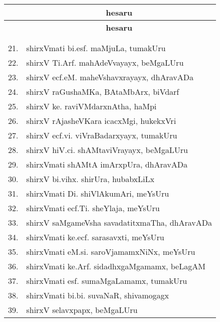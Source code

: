 \begin{center}
\begin{minipage}[t]{7cm}
{\begin{longtable}{rl}
\end{longtable}}
\end{minipage}
\qquad\quad
\begin{minipage}[t]{7cm}
{\renewcommand{\arraystretch}{1.5}
\begin{longtable}{rl}
\hline
{\bf } & \multicolumn{1}{c}{\bf hesaru}\\[3pt]
\hline
\endfirsthead
\hline
{\bf } & \multicolumn{1}{c}{\bf hesaru}\\[3pt]
\hline
  & \\[-10pt]
\endhead
\endfoot
\endlastfoot
  & \\[-10pt]
21. & shirxVmati bi.esf. maMjuLa, tumakUru\\
22. & shirxV Ti.Arf. mahAdeVvayayx, beMgaLUru\\
23. & shirxV ecf.eM. maheVshavxrayayx, dhAravADa\\
24. & shirxV raGushaMKa, BAtaMbArx, biVdarf\\
25. & shirxV ke. raviVMdarxnAtha, haMpi\\
26. & shirxV rAjasheVKara icacxMgi, hukekxVri\\
27. & shirxV ecf.vi. viVraBadarxyayx, tumakUru\\
28. & shirxV hiV.ci. shAMtaviVrayayx, beMgaLUru\\
29. & shirxVmati shAMtA imArxpUra, dhAravADa\\
30. & shirxV bi.vihx. shirUra, hubabxLiLx\\
31. & shirxVmati Di. shiVlAkumAri, meYsUru\\
32. & shirxVmati ecf.Ti. sheYlaja, meYsUru\\
33. & shirxV saMgameVsha savadatitxmaTha, dhAravADa\\
34. & shirxVmati ke.ecf. sarasavxti, meYsUru\\
35. & shirxVmati eM.si. saroVjamamxNiNx, meYsUru\\
36. & shirxVmati ke.Arf. sidadhxgaMgamamx, beLagAM\\
37. & shirxVmati esf. sumaMgaLamamx, tumakUru\\
38. & shirxVmati bi.bi. suvaNaR, shivamogagx\\
39. &  shirxV selavxpapx, beMgaLUru\\
\end{longtable}}
\end{minipage}
\end{center}
